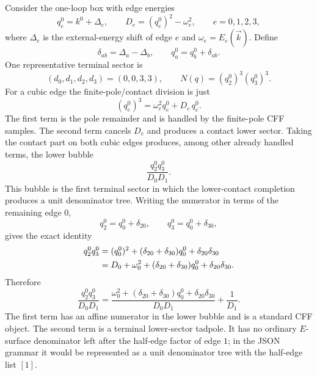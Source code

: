 \documentclass[11pt,a4paper]{report}
\begin{document}
Consider the one-loop box with edge energies
\[
  q_e^0=k^0+\Delta_e,\qquad
  D_e=(q_e^0)^2-\omega_e^2,\qquad e=0,1,2,3 ,
\]
where \(\Delta_e\) is the external-energy shift of edge \(e\) and
\(\omega_e=E_e(\vec k)\).  Define
\[
  \delta_{ab}=\Delta_a-\Delta_b ,
  \qquad q_a^0=q_b^0+\delta_{ab}.
\]
One representative terminal sector is
\[
  (d_0,d_1,d_2,d_3)=(0,0,3,3),
  \qquad
  N(q)= (q_2^0)^3(q_3^0)^3 .
\]
For a cubic edge the finite-pole/contact division is just
\begin{equation}
  (q_e^0)^3
  =
  \omega_e^2 q_e^0
  +
  D_e\,q_e^0 .
  \label{eq:cubic-one-edge-division}
\end{equation}
The first term is the pole remainder and is handled by the finite-pole CFF
samples.  The second term cancels \(D_e\) and produces a contact lower sector.
Taking the contact part on both cubic edges produces, among other already
handled terms, the lower bubble
\begin{equation}
  \frac{q_2^0 q_3^0}{D_0D_1}.
  \label{eq:terminal-contact-bubble}
\end{equation}
This bubble is the first terminal sector in which the lower-contact completion
produces a unit denominator tree.
Writing the numerator in terms of the remaining edge \(0\),
\[
  q_2^0=q_0^0+\delta_{20},
  \qquad
  q_3^0=q_0^0+\delta_{30},
\]
gives the exact identity
\begin{align}
  q_2^0q_3^0
  &=
  (q_0^0)^2+(\delta_{20}+\delta_{30})q_0^0
    +\delta_{20}\delta_{30}
  \notag\\
  &=
  D_0+
  \omega_0^2+(\delta_{20}+\delta_{30})q_0^0
    +\delta_{20}\delta_{30}.
  \label{eq:terminal-contact-polynomial-division}
\end{align}
Therefore
\begin{equation}
  \frac{q_2^0q_3^0}{D_0D_1}
  =
  \frac{
    \omega_0^2+(\delta_{20}+\delta_{30})q_0^0
      +\delta_{20}\delta_{30}}
       {D_0D_1}
  +
  \frac{1}{D_1}.
  \label{eq:terminal-contact-tadpole}
\end{equation}
The first term has an affine numerator in the lower bubble and is a standard
CFF object.  The second term is a terminal lower-sector tadpole.  It has no
ordinary \(E\)-surface denominator left after the half-edge factor of edge
\(1\); in the JSON grammar it would be represented as a unit denominator tree
with the half-edge list \([1]\).
\end{document}
